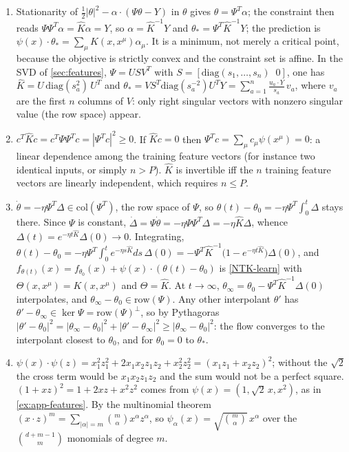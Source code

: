 \documentclass[11pt]{article}
\begin{document}
\begin{solution}
\begin{enumerate}
    \item Stationarity of $\frac{1}{2}|\theta|^2-\alpha\cdot(\Psi\theta-Y)$ in $\theta$ gives $\theta = \Psi^T\alpha$; the constraint then reads $\Psi\Psi^T\alpha = \hat K\alpha = Y$, so $\alpha = \hat K^{-1}Y$ and $\theta_* = \Psi^T\hat K^{-1}Y$; the prediction is $\psi(x)\cdot\theta_* = \sum_\mu K(x,x^\mu)\alpha_\mu$. It is a minimum, not merely a critical point, because the objective is strictly convex and the constraint set is affine. In the SVD of \cref{sec:features}, $\Psi = USV^T$ with $S = [\mathrm{diag}(s_1,\ldots,s_n)\;\; 0]$, one has $\hat K = U\,\mathrm{diag}(s_a^2)\,U^T$ and
    $\theta_* = VS^T\mathrm{diag}(s_a^{-2})U^TY = \sum_{a=1}^n \frac{u_a\cdot Y}{s_a}\,v_a$,
    where $v_a$ are the first $n$ columns of $V$: only right singular vectors with nonzero singular value (the row space) appear.
    \item $c^T\hat Kc = c^T\Psi\Psi^Tc = |\Psi^Tc|^2\geq 0$. If $\hat Kc = 0$ then $\Psi^Tc = \sum_\mu c_\mu\psi(x^\mu) = 0$: a linear dependence among the training feature vectors (for instance two identical inputs, or simply $n>P$). $\hat K$ is invertible iff the $n$ training feature vectors are linearly independent, which requires $n\leq P$.
    \item $\dot\theta = -\eta\Psi^T\Delta\in\mathrm{col}(\Psi^T)$, the row space of $\Psi$, so $\theta(t)-\theta_0 = -\eta\Psi^T\int_0^t\Delta$ stays there. Since $\Psi$ is constant, $\dot\Delta = \Psi\dot\theta = -\eta\Psi\Psi^T\Delta = -\eta\hat K\Delta$, whence $\Delta(t) = e^{-\eta t\hat K}\Delta(0)\to 0$. Integrating,
    $\theta(t)-\theta_0 = -\eta\Psi^T\!\int_0^t e^{-\eta s\hat K}ds\,\Delta(0) = -\Psi^T\hat K^{-1}\big(1-e^{-\eta t\hat K}\big)\Delta(0)$,
    and $f_{\theta(t)}(x) = f_{\theta_0}(x)+\psi(x)\cdot(\theta(t)-\theta_0)$ is \eqref{NTK-learn} with $\Theta(x,x^\mu) = K(x,x^\mu)$ and $\Theta = \hat K$. At $t\to\infty$, $\theta_\infty = \theta_0-\Psi^T\hat K^{-1}\Delta(0)$ interpolates, and $\theta_\infty-\theta_0\in\mathrm{row}(\Psi)$. Any other interpolant $\theta'$ has $\theta'-\theta_\infty\in\ker\Psi = \mathrm{row}(\Psi)^\perp$, so by Pythagoras $|\theta'-\theta_0|^2 = |\theta_\infty-\theta_0|^2+|\theta'-\theta_\infty|^2\geq|\theta_\infty-\theta_0|^2$: the flow converges to the interpolant closest to $\theta_0$, and for $\theta_0=0$ to $\theta_*$.
    \item $\psi(x)\cdot\psi(z) = x_1^2z_1^2+2x_1x_2z_1z_2+x_2^2z_2^2 = (x_1z_1+x_2z_2)^2$; without the $\sqrt2$ the cross term would be $x_1x_2z_1z_2$ and the sum would not be a perfect square. $(1+xz)^2 = 1+2xz+x^2z^2$ comes from $\psi(x) = (1,\sqrt2\,x,x^2)$, as in \cref{ex:app-features}. By the multinomial theorem $(x\cdot z)^m = \sum_{|\alpha|=m}\binom{m}{\alpha}x^\alpha z^\alpha$, so $\psi_\alpha(x) = \sqrt{\binom{m}{\alpha}}\,x^\alpha$ over the $\binom{d+m-1}{m}$ monomials of degree $m$.
\end{enumerate}
\end{solution}
\end{document}
